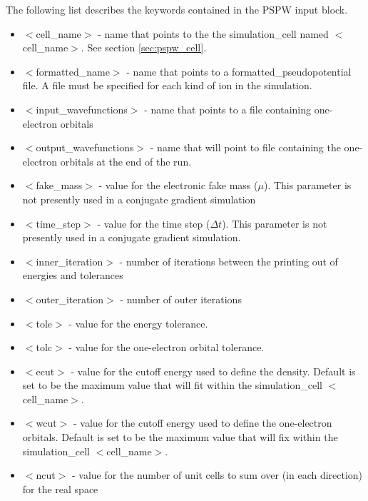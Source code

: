 The following list describes the keywords contained in the PSPW input block.
\begin{itemize}
        \item $<$cell\_name$>$ - name that points to the
              the simulation\_cell named $<$cell\_name$>$.  See section \ref{sec:pspw_cell}.
        \item $<$formatted\_name$>$ - name that points
              to a formatted\_pseudopotential file.  A file must
              be specified for each kind of ion in the simulation.
        \item $<$input\_wavefunctions$>$ - name that points
              to a file containing one-electron orbitals
        \item $<$output\_wavefunctions$>$ - name that will
              point to file containing the one-electron orbitals at the
              end of the run. 
        \item $<$fake\_mass$>$ - value for the electronic
              fake mass ($\mu$). This parameter is not presently used in a 
              conjugate gradient simulation
        \item $<$time\_step$>$ - value for the time step ($\Delta t$).  This
              parameter is not presently used in a conjugate gradient simulation.
        \item $<$inner\_iteration$>$ - number of iterations between the 
              printing out of energies and tolerances
        \item $<$outer\_iteration$>$ - number of outer iterations
        \item $<$tole$>$ - value for the energy tolerance.
        \item $<$tolc$>$ - value for the one-electron orbital tolerance.
        \item $<$ecut$>$ - value for the cutoff energy used
                           to define the density. Default is set
                           to be the maximum value that will fit
                           within the simulation\_cell $<$cell\_name$>$.
        \item $<$wcut$>$ - value for the cutoff energy used
                           to define the one-electron orbitals.
                           Default is set to be the maximum value that 
                           will fix within the simulation\_cell $<$cell\_name$>$.
        \item $<$ncut$>$ - value for the number of unit cells
                          to sum over (in each direction) for the real space

\end{itemize}
